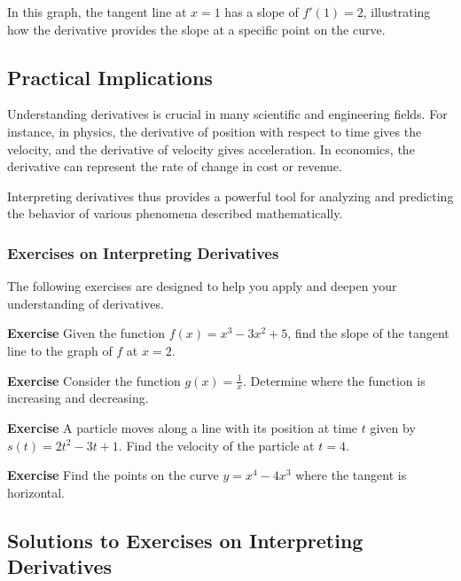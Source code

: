 \documentclass[a4paper,12pt]{book}
\newenvironment{exercise}[1][]
  {\par\medskip\noindent\textbf{Exercise #1} \rmfamily}
  {\medskip}
\begin{document}
In this graph, the tangent line at \( x = 1 \) has a slope of \( f'(1) = 2 \), illustrating how the derivative provides the slope at a specific point on the curve.

\subsection{Practical Implications}
Understanding derivatives is crucial in many scientific and engineering fields. For instance, in physics, the derivative of position with respect to time gives the velocity, and the derivative of velocity gives acceleration. In economics, the derivative can represent the rate of change in cost or revenue.

Interpreting derivatives thus provides a powerful tool for analyzing and predicting the behavior of various phenomena described mathematically.

\subsubsection*{Exercises on Interpreting Derivatives}

The following exercises are designed to help you apply and deepen your understanding of derivatives.

\begin{exercise}
Given the function \( f(x) = x^3 - 3x^2 + 5 \), find the slope of the tangent line to the graph of \( f \) at \( x = 2 \).
\end{exercise}

\begin{exercise}
Consider the function \( g(x) = \frac{1}{x} \). Determine where the function is increasing and decreasing.
\end{exercise}

\begin{exercise}
A particle moves along a line with its position at time \( t \) given by \( s(t) = 2t^2 - 3t + 1 \). Find the velocity of the particle at \( t = 4 \).
\end{exercise}

\begin{exercise}
Find the points on the curve \( y = x^4 - 4x^3 \) where the tangent is horizontal.
\end{exercise}

\subsection{Solutions to Exercises on Interpreting Derivatives}
\end{document}
